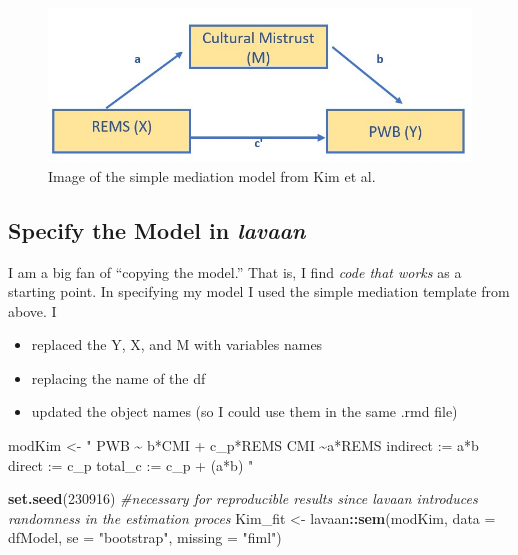 \documentclass[
  11pt,
]{book}
\newenvironment{Shaded}{\begin{snugshade}}{\end{snugshade}}
\newcommand{\AttributeTok}[1]{\textcolor[rgb]{0.27,0.27,0.27}{#1}}
\newcommand{\CommentTok}[1]{\textcolor[rgb]{0.37,0.37,0.37}{\textit{#1}}}
\newcommand{\DecValTok}[1]{\textcolor[rgb]{0.06,0.06,0.06}{#1}}
\newcommand{\FunctionTok}[1]{\textcolor[rgb]{0.27,0.27,0.27}{\textbf{#1}}}
\newcommand{\NormalTok}[1]{#1}
\newcommand{\OtherTok}[1]{\textcolor[rgb]{0.37,0.37,0.37}{#1}}
\newcommand{\SpecialCharTok}[1]{\textcolor[rgb]{0.43,0.43,0.43}{\textbf{#1}}}
\newcommand{\StringTok}[1]{\textcolor[rgb]{0.5,0.5,0.5}{#1}}
\providecommand{\tightlist}{%
  \setlength{\itemsep}{0pt}\setlength{\parskip}{0pt}}
\begin{document}
\begin{figure}
\centering
\includegraphics{images/SimpleMed/Kim_SimpMed.jpg}
\caption{Image of the simple mediation model from Kim et al.}
\end{figure}

\hypertarget{specify-the-model-in-lavaan}{%
\subsection{\texorpdfstring{Specify the Model in \emph{lavaan}}{Specify the Model in lavaan}}\label{specify-the-model-in-lavaan}}

I am a big fan of ``copying the model.'' That is, I find \emph{code that works} as a starting point. In specifying my model I used the simple mediation template from above. I

\begin{itemize}
\tightlist
\item
  replaced the Y, X, and M with variables names
\item
  replacing the name of the df
\item
  updated the object names (so I could use them in the same .rmd file)
\end{itemize}

\begin{Shaded}
\begin{Highlighting}[]
\NormalTok{modKim }\OtherTok{\textless{}{-}} \StringTok{"}
\StringTok{          PWB \textasciitilde{} b*CMI + c\_p*REMS }
\StringTok{          CMI \textasciitilde{}a*REMS}
\StringTok{          }
\StringTok{          indirect :=  a*b}
\StringTok{          direct  := c\_p}
\StringTok{          total\_c  := c\_p + (a*b)}
\StringTok{          "}
\end{Highlighting}
\end{Shaded}

\begin{Shaded}
\begin{Highlighting}[]
\FunctionTok{set.seed}\NormalTok{(}\DecValTok{230916}\NormalTok{)  }\CommentTok{\#necessary for reproducible results since lavaan introduces randomness in the estimation proces}
\NormalTok{Kim\_fit }\OtherTok{\textless{}{-}}\NormalTok{ lavaan}\SpecialCharTok{::}\FunctionTok{sem}\NormalTok{(modKim, }\AttributeTok{data =}\NormalTok{ dfModel, }\AttributeTok{se =} \StringTok{"bootstrap"}\NormalTok{, }\AttributeTok{missing =} \StringTok{"fiml"}\NormalTok{)}
\end{Highlighting}
\end{Shaded}
\end{document}

